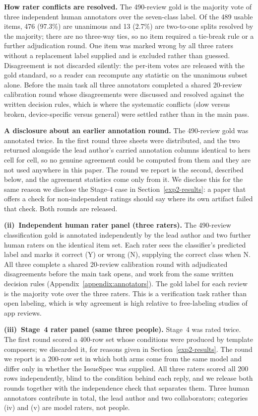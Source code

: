 \documentclass[sigconf, anonymous]{acmart}
\begin{document}
\textbf{How rater conflicts are resolved.} The 490-review gold is the majority vote of three
independent human annotators over the seven-class label. Of the 489 usable items, 476 (97.3\%)
are unanimous and 13 (2.7\%) are two-to-one splits resolved by the majority; there are no
three-way ties, so no item required a tie-break rule or a further adjudication round. One item
was marked wrong by all three raters without a replacement label supplied and is excluded rather
than guessed. Disagreement is not discarded silently: the per-item votes are released with the
gold standard, so a reader can recompute any statistic on the unanimous subset alone. Before the
main task all three annotators completed a shared 20-review calibration round whose
disagreements were discussed and resolved against the written decision rules, which is where the
systematic conflicts (slow versus broken, device-specific versus general) were settled rather
than in the main pass.

\textbf{A disclosure about an earlier annotation round.} The 490-review gold was annotated
twice. In the first round three sheets were distributed, and the two returned alongside the lead
author's carried annotation columns identical to hers cell for cell, so no genuine agreement
could be computed from them and they are not used anywhere in this paper. The round we report is
the second, described below, and the agreement statistics come only from it. We disclose this for
the same reason we disclose the Stage-4 case in Section~\ref{exp2-results}: a paper that offers a
check for non-independent ratings should say where its own artifact failed that check. Both
rounds are released.

\textbf{(ii)~Independent human rater panel (three raters).} The 490-review classification gold is annotated independently by the lead author and two further human raters on the identical item set. Each rater sees the classifier's predicted label and marks it correct (Y) or wrong (N), supplying the correct class when N. All three complete a shared 20-review calibration round with adjudicated disagreements before the main task opens, and work from the same written decision rules (Appendix~\ref{appendix:annotators}). The gold label for each review is the majority vote over the three raters. This is a verification task rather than open labeling, which is why agreement is high relative to free-labeling studies of app reviews.

\textbf{(iii)~Stage~4 rater panel (same three people).} Stage~4 was rated twice. The first round scored a 400-row set whose conditions were produced by template composers; we discarded it, for reasons given in Section~\ref{exp2-results}. The round we report is a 200-row set in which both arms come from the same model and differ only in whether the IssueSpec was supplied. All three raters scored all 200 rows independently, blind to the condition behind each reply, and we release both rounds together with the independence check that separates them. Three human annotators contribute in total, the lead author and two collaborators; categories (iv) and (v) are model raters, not people.
\end{document}
